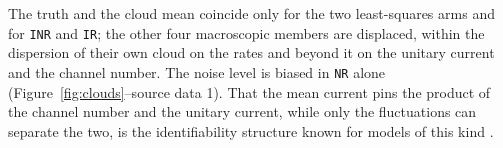 The truth and the cloud mean coincide only for the two least-squares arms and for \texttt{INR} and
\texttt{IR}; the other four macroscopic members are displaced, within the dispersion of their own
cloud on the rates and beyond it on the unitary current and the channel number. The noise level is
biased in \texttt{NR} alone (Figure~\ref{fig:clouds}--source data 1).
That the mean current pins the product of the channel number and the unitary current,
while only the fluctuations can separate the two, is the identifiability structure known for
models of this kind \citep{hines2014determination}.
